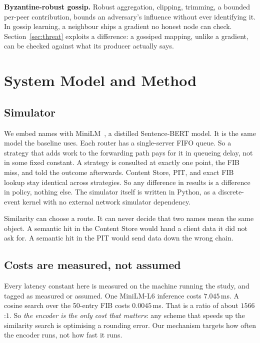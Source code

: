 \documentclass[conference]{IEEEtran}
\begin{document}
		\textbf{Byzantine-robust gossip.} Robust aggregation, clipping, trimming, a
		bounded per-peer contribution, bounds an adversary's influence without ever
		identifying it. In gossip learning, a neighbour ships a gradient no honest
		node can check. Section~\ref{sec:threat} exploits a difference: a gossiped
		mapping, unlike a gradient, can be checked against what its producer
		actually says.
		
		\section{System Model and Method}
		\label{sec:method}
		
		\subsection{Simulator}
		
		We embed names with MiniLM~\cite{wang2020minilm}, a distilled Sentence-BERT
		model. It is the same model the baseline uses. Each router has a
		single-server FIFO queue. So a strategy that adds work to the forwarding
		path pays for it in queueing delay, not in some fixed constant. A strategy
		is consulted at exactly one point, the FIB miss, and told the outcome
		afterwards. Content Store, PIT, and exact FIB lookup stay identical across
		strategies. So any difference in results is a difference in policy, nothing
		else. The simulator itself is written in Python, as a discrete-event
		kernel with no external network simulator dependency.
		
		Similarity can choose a route. It can never decide that two names mean the
		same object. A semantic hit in the Content Store would hand a client data it
		did not ask for. A semantic hit in the PIT would send data down the wrong
		chain.
		
		\subsection{Costs are measured, not assumed}
		
		Every latency constant here is measured on the machine running the study,
		and tagged as measured or assumed. One MiniLM-L6 inference costs
		$7.045$\,ms. A cosine search over the 50-entry FIB costs $0.0045$\,ms. That
		is a ratio of about $1566$:$1$. So \emph{the encoder is the only cost that
			matters}: any scheme that speeds up the similarity search is optimising a
		rounding error. Our mechanism targets how often the encoder runs, not how
		fast it runs.
		
\end{document}
